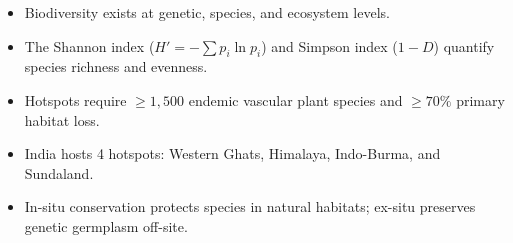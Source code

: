 \begin{quickrevision}
\begin{itemize}[leftmargin=1.2em]
    \item Biodiversity exists at genetic, species, and ecosystem levels.
    \item The Shannon index ($H' = -\sum p_i \ln p_i$) and Simpson index ($1 - D$) quantify species richness and evenness.
    \item Hotspots require $\ge 1{,}500$ endemic vascular plant species and $\ge 70\%$ primary habitat loss.
    \item India hosts 4 hotspots: Western Ghats, Himalaya, Indo-Burma, and Sundaland.
    \item In-situ conservation protects species in natural habitats; ex-situ preserves genetic germplasm off-site.
\end{itemize}
\end{quickrevision}
